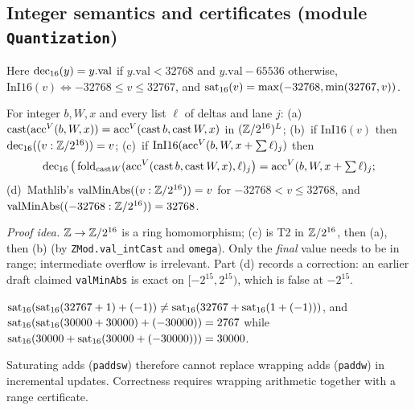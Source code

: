 \subsection{Integer semantics and certificates (module \texttt{Quantization})}

Here $\operatorname{dec_{16}}(y)=y.\mathrm{val}$ if $y.\mathrm{val}<32768$ and $y.\mathrm{val}-65536$ otherwise, $\mathrm{InI16}(v)\iff-32768\le v\le32767$, and $\operatorname{sat_{16}}(v)=\max(-32768,\min(32767,v))$.

\begin{theorem}\label{thm:t7}
For integer $b,W,x$ and every list $\ell$ of deltas and lane $j$:
(a)~$\mathrm{cast}(\mathrm{acc}^{V}(b,W,x))=\mathrm{acc}^{V}(\mathrm{cast}\,b,\mathrm{cast}\,W,x)$ in $(\mathbb{Z}/2^{16})^L$;
(b)~if $\mathrm{InI16}(v)$ then $\operatorname{dec_{16}}((v:\mathbb{Z}/2^{16}))=v$;
(c)~if $\mathrm{InI16}(\mathrm{acc}^{V}(b,W,x+\sum\ell)_j)$ then
\[\operatorname{dec_{16}}\big(\operatorname{fold}_{\mathrm{cast}W}(\mathrm{acc}^{V}(\mathrm{cast}\,b,\mathrm{cast}\,W,x),\ell)_j\big)=\mathrm{acc}^{V}(b,W,x+\textstyle\sum\ell)_j;\]
(d)~Mathlib's $\mathrm{valMinAbs}((v:\mathbb{Z}/2^{16}))=v$ for $-32768<v\le32768$, and $\mathrm{valMinAbs}((-32768:\mathbb{Z}/2^{16}))=32768$.
\end{theorem}
\noindent\emph{Proof idea.} $\mathbb{Z}\to\mathbb{Z}/2^{16}$ is a ring homomorphism; (c) is T2 in $\mathbb{Z}/2^{16}$, then (a), then (b) (by \texttt{ZMod.val\_intCast} and \texttt{omega}).
Only the \emph{final} value needs to be in range; intermediate overflow is irrelevant.
Part (d) records a correction: an earlier draft claimed \texttt{valMinAbs} is exact on $[-2^{15},2^{15})$, which is false at $-2^{15}$.

\begin{theorem}\label{thm:t8}
$\operatorname{sat_{16}}(\operatorname{sat_{16}}(32767+1)+(-1))\neq\operatorname{sat_{16}}(32767+\operatorname{sat_{16}}(1+(-1)))$, and
$\operatorname{sat_{16}}(\operatorname{sat_{16}}(30000+30000)+(-30000))=2767$ while $\operatorname{sat_{16}}(30000+\operatorname{sat_{16}}(30000+(-30000)))=30000$.
\end{theorem}
\noindent Saturating adds (\texttt{paddsw}) therefore cannot replace wrapping adds (\texttt{paddw}) in incremental updates. Correctness requires wrapping arithmetic together with a range certificate.

